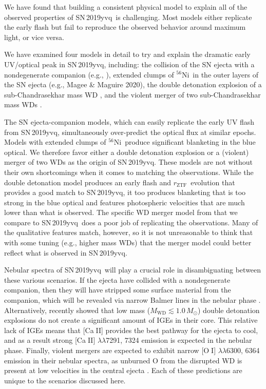 \documentclass[twocolumn]{aastex63}
\def\ion#1#2{#1$\;${\footnotesize\rm{#2}}\relax}
\newcommand{\rztf}{$r_\mathrm{ZTF}$}
\newcommand{\radni}{$^{56}$Ni}
\newcommand{\sn}{SN\,2019yvq}
\begin{document}
We have found that building a consistent physical model to explain all of the
observed properties of \sn\ is challenging. Most models either replicate the
early flash but fail to reproduce the observed behavior around maximum light,
or vice versa.

We have examined four models in detail to try and explain the dramatic early
UV/optical peak in \sn, including: the collision of the SN ejecta with a
nondegenerate companion (e.g., \citealt{Kasen10a}), extended clumps of \radni\
in the outer layers of the SN ejecta (e.g., Magee \& Maguire 2020), the double
detonation explosion of a sub-Chandrasekhar mass WD \citep[e.g.,][]{Polin19},
and the violent merger of two sub-Chandrasekhar mass WDs
\citep[e.g.,][]{Kromer16}.

The SN ejecta-companion models, which can easily replicate the early UV flash
from \sn, simultaneously over-predict the optical flux at similar epochs.
Models with extended clumps of \radni\ produce significant blanketing in the
blue optical. We therefore favor either a double detonation explosion or a
(violent) merger of two WDs as the origin of \sn. These models are not without
their own shortcomings when it comes to matching the observations. While the
double detonation model produces an early flash and \rztf\ evolution that
provides a good match to \sn, it too produces blanketing that is too strong in
the blue optical and features photospheric velocities that are much lower than
what is observed. The specific WD merger model from \citet{Kromer16} that we
compare to \sn\ does a poor job of replicating the observations. Many of the
qualitative features match, however, so it is not unreasonable to think that
with some tuning (e.g., higher mass WDs) that the merger model could better
reflect what is observed in \sn.

Nebular spectra of \sn\ will play a crucial role in disambiguating between
these various scenarios. If the ejecta have collided with a nondegenerate
companion, then they will have stripped some surface material from the
companion, which will be revealed via narrow Balmer lines in the nebular phase
\citep[e.g.,][]{Wheeler75}. Alternatively, \citet{Polin19a} recently showed
that low mass ($M_\mathrm{WD} \lesssim 1.0\,M_\odot$) double detonation
explosions do not create a significant amount of IGEs in their core. This
relative lack of IGEs means that [\ion{Ca}{II}] provides the best pathway for
the ejecta to cool, and as a result strong [\ion{Ca}{II}]
$\lambda\lambda$7291, 7324 emission is expected in the nebular phase. Finally,
violent mergers are expected to exhibit narrow [\ion{O}{I}]
$\lambda\lambda$6300, 6364 emission in their nebular spectra, as unburned O
from the disrupted WD is present at low velocities in the central ejecta
\citep{Kromer16}. Each of these predictions are unique to the scenarios
discussed here.
\end{document}
